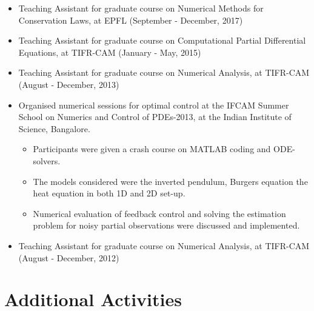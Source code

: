 \documentclass[margin]{res}
\begin{document}
\begin{resume}
               \begin{itemize} \itemsep -2pt
                \item Teaching Assistant for graduate course on Numerical Methods for Conservation Laws, at EPFL (September - December, 2017)
               \item Teaching Assistant for graduate course on Computational Partial Differential Equations, at TIFR-CAM (January - May, 2015)
               \item Teaching Assistant for graduate course on Numerical Analysis, at TIFR-CAM  (August - December, 2013)
               \item Organised numerical sessions for optimal control at the IFCAM Summer School on Numerics and Control of PDEs-2013, at the Indian Institute of Science, Bangalore. 
               \begin{itemize}
                 \item Participants were given a crash course on MATLAB coding and ODE-solvers.
                 \item The models considered were the inverted pendulum,  Burgers equation the heat equation in both 1D and 2D set-up.
                 \item Numerical evaluation of feedback control and solving the estimation problem for noisy partial observations were discussed and implemented.
               \end{itemize}
               \item Teaching Assistant for graduate course on Numerical Analysis, at TIFR-CAM   (August - December, 2012)
               \end{itemize}              

\section{Additional Activities} 
   

\end{resume}
\end{document}
